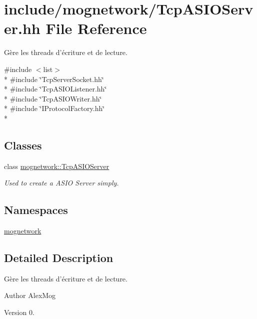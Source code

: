 \hypertarget{_tcp_a_s_i_o_server_8hh}{\section{include/mognetwork/\-Tcp\-A\-S\-I\-O\-Server.hh File Reference}
\label{_tcp_a_s_i_o_server_8hh}
}


Gère les threads d'écriture et de lecture.  


{\ttfamily \#include $<$list$>$}\\*
{\ttfamily \#include \char`\"{}Tcp\-Server\-Socket.\-hh\char`\"{}}\\*
{\ttfamily \#include \char`\"{}Tcp\-A\-S\-I\-O\-Listener.\-hh\char`\"{}}\\*
{\ttfamily \#include \char`\"{}Tcp\-A\-S\-I\-O\-Writer.\-hh\char`\"{}}\\*
{\ttfamily \#include \char`\"{}I\-Protocol\-Factory.\-hh\char`\"{}}\\*
\subsection*{Classes}
\begin{DoxyCompactItemize}
\item 
class \hyperlink{classmognetwork_1_1_tcp_a_s_i_o_server}{mognetwork\-::\-Tcp\-A\-S\-I\-O\-Server}
\begin{DoxyCompactList}\small\item\em Used to create a A\-S\-I\-O Server simply. \end{DoxyCompactList}\end{DoxyCompactItemize}
\subsection*{Namespaces}
\begin{DoxyCompactItemize}
\item 
\hyperlink{namespacemognetwork}{mognetwork}
\end{DoxyCompactItemize}


\subsection{Detailed Description}
Gère les threads d'écriture et de lecture. \begin{DoxyAuthor}{Author}
Alex\-Mog 
\end{DoxyAuthor}
\begin{DoxyVersion}{Version}
0. 
\end{DoxyVersion}
